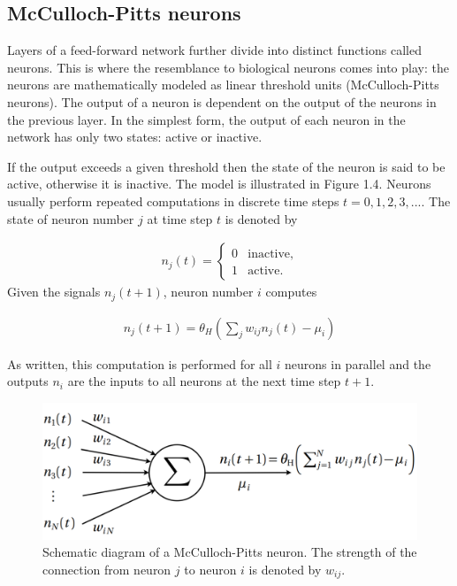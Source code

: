 \subsection{McCulloch-Pitts neurons}

Layers of a feed-forward network further divide into distinct functions called neurons. This is where the resemblance to biological neurons comes into play: the neurons are mathematically modeled as linear threshold units (McCulloch-Pitts neurons). The output of a neuron is dependent on the output of the neurons in the previous layer. In the simplest form, the output of each neuron in the network has only two states: active or inactive. \cite{mehlig}

If the output exceeds a given threshold then the state of the neuron is said to be active, otherwise it is inactive. The model is illustrated in Figure 1.4. Neurons usually perform repeated computations in discrete time steps $ t = 0,1,2,3,.... $ The state of neuron number $ j $ at time step $ t $ is denoted by \cite{mehlig}

\begin{gather}
n_j(t) = 
	\begin{cases}	
		0 & \text{inactive,}\\
		1 & \text{active.}
	\end{cases} 
\end{gather}
\noindent Given the signals $ n_j(t+1) $, neuron number $ i $ computes \cite{mehlig}

\begin{gather}
\label{neuron_output}
n_j(t+1)=\theta_H \left(\sum\limits_{j}w_{ij}n_j(t) - \mu_i \right)
\end{gather}

As written, this computation is performed for all $ i $ neurons in parallel and the outputs $ n_i $ are the inputs to all neurons at the next time step $ t+1 $.

\newpage
\vspace{5mm}
\begin{figure}[htb]
	\begin{center}
		\includegraphics*[width=13cm, keepaspectratio]{obr/neuron.png}
	\end{center}
	\vspace{5mm}
	\caption{Schematic diagram of a McCulloch-Pitts neuron. The strength of the connection from
		neuron $ j $ to neuron $ i $ is denoted by $ w_{ij} $. \cite{mehlig}} 
	\label{neuron}
\end{figure}

